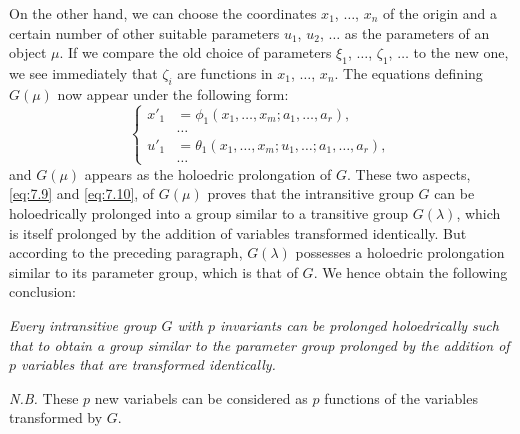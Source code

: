 On the other hand, we can choose the coordinates $x_{1}$, $\dots$, $x_{n}$ of the origin and a certain number of other suitable parameters $u_{1}$, $u_{2}$, $\dots$ as the parameters of an object $\mu$. If we compare the old choice of parameters $\xi_{1}$, $\dots$, $\zeta_{1}$, $\dots$ to the new one, we see immediately that $\zeta_{i}$ are functions in $x_{1}$, $\dots$, $x_{n}$. The equations defining $G(\mu)$ now appear under the following form:
\begin{equation}
  \label{eq:7.11}
  \left\{
    \begin{aligned}
      x'_{1}&=\phi_{1}(x_{1},\dots,x_{m};a_{1},\dots,a_{r}),\\
      &\dots\\
      u'_{1}&=\theta_{1}(x_{1},\dots,x_{m};u_{1},\dots;a_{1},\dots,a_{r}),\\
      &\dots
    \end{aligned}
  \right.
\end{equation}
and $G(\mu)$ appears as the holoedric prolongation of $G$. These two aspects, \eqref{eq:7.9} and \eqref{eq:7.10}, of $G(\mu)$ proves that the intransitive group $G$ can be holoedrically prolonged into a group similar to a transitive group $G(\lambda)$, which is itself prolonged by the addition of variables transformed identically. But according to the preceding paragraph, $G(\lambda)$ possesses a holoedric prolongation similar to its parameter group, which is that of $G$. We hence obtain the following conclusion:

\somespace

\emph{Every intransitive group $G$ with $p$ invariants can be prolonged holoedrically such that to obtain a group similar to the parameter group prolonged by the addition of $p$ variables that are transformed identically.}

\somespace

\emph{N.B.} These $p$ new variabels can be considered as $p$ functions of the variables transformed by $G$.


